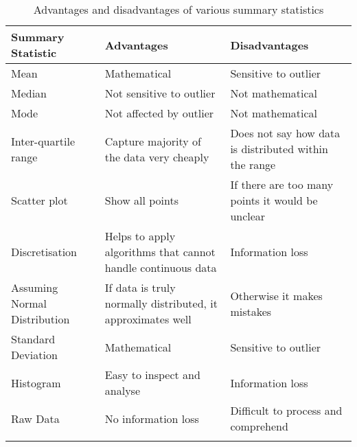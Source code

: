 \clearpage
\begin{longtable}{ | p{3cm} | p{5cm} | p{5cm} | } 
    \hline
    \textbf{Summary Statistic} & \textbf{Advantages} & \textbf{Disadvantages} \\ \hline
    Mean & Mathematical & Sensitive to outlier\\ \hline
    Median & Not sensitive to outlier & Not mathematical\\ \hline
    Mode & Not affected by outlier & Not mathematical\\ \hline
    Inter-quartile range & Capture majority of the data very cheaply & Does not say how data is distributed within the range\\ \hline
    Scatter plot & Show all points & If there are too many points it would be unclear\\ \hline
    Discretisation & Helps to apply algorithms that cannot handle continuous data & Information loss\\ \hline
    Assuming Normal Distribution & If data is truly normally distributed, it approximates well & Otherwise it makes mistakes\\ \hline
    Standard Deviation & Mathematical & Sensitive to outlier\\ \hline
    Histogram & Easy to inspect and analyse & Information loss\\ \hline
    Raw Data & No information loss & Difficult to process and comprehend\\ \hline
\caption{Advantages and disadvantages of various summary statistics}
\label{table:5}
\end{longtable}